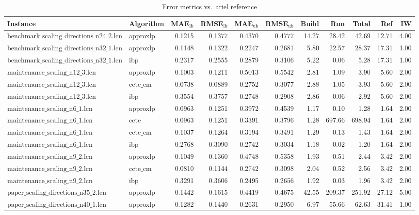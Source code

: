 \begin{table}[ht]
\centering
\scriptsize
\caption{Error metrics vs.\ ariel reference}
\begin{tabular}{llrrrrrrrrr}
\toprule
Instance & Algorithm & MAE$_{\text{lb}}$ & RMSE$_{\text{lb}}$ & MAE$_{\text{ub}}$ & RMSE$_{\text{ub}}$ & Build & Run & Total & Ref & IW \\
\midrule
$\text{benchmark\_scaling\_directions\_n24\_2.lcn}$ & approxlp & 0.1215 & 0.1377 & 0.4370 & 0.4777 & 14.27 & 28.42 & 42.69 & 12.71 & 4.00 \\
$\text{benchmark\_scaling\_directions\_n32\_1.lcn}$ & approxlp & 0.1148 & 0.1322 & 0.2247 & 0.2681 & 5.80 & 22.57 & 28.37 & 17.31 & 1.00 \\
$\text{benchmark\_scaling\_directions\_n32\_1.lcn}$ & ibp & 0.2317 & 0.2555 & 0.2879 & 0.3106 & 5.22 & 0.06 & 5.28 & 17.31 & 1.00 \\
$\text{maintenance\_scaling\_n12\_3.lcn}$ & approxlp & 0.1003 & 0.1211 & 0.5013 & 0.5542 & 2.81 & 1.09 & 3.90 & 5.60 & 2.00 \\
$\text{maintenance\_scaling\_n12\_3.lcn}$ & $\text{ccte\_cm}$ & 0.0738 & 0.0889 & 0.2752 & 0.3077 & 2.88 & 1.05 & 3.93 & 5.60 & 2.00 \\
$\text{maintenance\_scaling\_n12\_3.lcn}$ & ibp & 0.3554 & 0.3757 & 0.2748 & 0.2908 & 2.86 & 0.06 & 2.92 & 5.60 & 2.00 \\
$\text{maintenance\_scaling\_n6\_1.lcn}$ & approxlp & 0.0963 & 0.1251 & 0.3972 & 0.4539 & 1.17 & 0.10 & 1.28 & 1.64 & 2.00 \\
$\text{maintenance\_scaling\_n6\_1.lcn}$ & ccte & 0.0963 & 0.1251 & 0.3391 & 0.3796 & 1.28 & 697.66 & 698.94 & 1.64 & 2.00 \\
$\text{maintenance\_scaling\_n6\_1.lcn}$ & $\text{ccte\_cm}$ & 0.1037 & 0.1264 & 0.3194 & 0.3491 & 1.29 & 0.13 & 1.43 & 1.64 & 2.00 \\
$\text{maintenance\_scaling\_n6\_1.lcn}$ & ibp & 0.2768 & 0.3090 & 0.2742 & 0.3034 & 1.18 & 0.02 & 1.20 & 1.64 & 2.00 \\
$\text{maintenance\_scaling\_n9\_2.lcn}$ & approxlp & 0.1049 & 0.1360 & 0.4748 & 0.5358 & 1.93 & 0.51 & 2.44 & 3.42 & 2.00 \\
$\text{maintenance\_scaling\_n9\_2.lcn}$ & $\text{ccte\_cm}$ & 0.0810 & 0.1144 & 0.2742 & 0.3098 & 2.04 & 0.52 & 2.56 & 3.42 & 2.00 \\
$\text{maintenance\_scaling\_n9\_2.lcn}$ & ibp & 0.3291 & 0.3606 & 0.2495 & 0.2656 & 1.92 & 0.03 & 1.96 & 3.42 & 2.00 \\
$\text{paper\_scaling\_directions\_n35\_2.lcn}$ & approxlp & 0.1442 & 0.1615 & 0.4419 & 0.4675 & 42.55 & 209.37 & 251.92 & 27.12 & 5.00 \\
$\text{paper\_scaling\_directions\_n40\_1.lcn}$ & approxlp & 0.1282 & 0.1440 & 0.2631 & 0.2950 & 6.97 & 55.66 & 62.63 & 31.41 & 1.00 \\
\bottomrule
\end{tabular}
\end{table}
